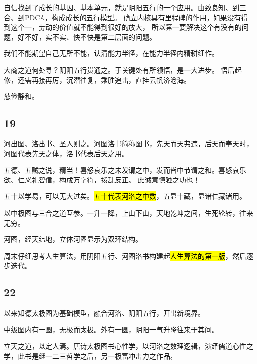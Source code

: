 自信找到了成长的基因、基本单元，就是阴阳五行的一个应用。由致良知、到三合、到PDCA，构成成长的五行模型。
确立内核具有里程碑的作用，如果没有得到这个一，劳动的价值就不能得到很好的放大，
所以第一要解决这个有没有的问题，好不好，实不实、快不快是第二层面的问题。

我们不能期望自己无所不能，认清能力半径，在能力半径内精耕细作。

大商之道何处寻？阴阳五行贯通之。于关键处有所领悟，是一大进步。
悟后起修，还需再接再厉，沉潜往复，乘胜追击，直挂云帆济沧海。

慈俭静和。

\subsection{19}

河出图、洛出书、圣人则之。河图洛书简称图书，先天而天弗违，后天而奉天时，河图代表先天之体，洛书代表后天之用。

五德、五贼之说，精当！喜怒哀乐之未发谓之中，发而皆中节谓之和。喜怒哀乐欲、仁义礼智信，构成万字符，拨乱反正。
此诚意慎独之功也！

五十以学易，可以无大过矣。\hl{五十代表河洛之中数}，五显十藏，显诸仁藏诸用。

以中极图与三合之道互参。一升一降，上山下山，天地乾坤之间，生死轮转，往来无穷。

河图，经天纬地，立体河图显示为双环结构。

周末仔细思考人生算法，用阴阳五行、河图洛书构建起\hl{人生算法的第一版}，然后逐步迭代。

\subsection{22}

以来知德太极图为基础模型，融合河洛、阴阳五行，开出新境界。

中级图内有一圆，无极而太极。外有一圆，阴阳一气升降往来于其间。

立天之道，以定人焉。唐诗太极图书心性学，以河洛之数理逻辑，演绎儒道心性之学，此书是继一二三哲学之后，另一极富冲击力之作品。


